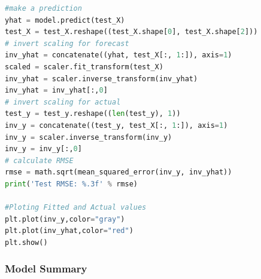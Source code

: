 \begin{lstlisting}[language=Python]
#make a prediction
yhat = model.predict(test_X)
test_X = test_X.reshape((test_X.shape[0], test_X.shape[2]))
# invert scaling for forecast
inv_yhat = concatenate((yhat, test_X[:, 1:]), axis=1)
scaled = scaler.fit_transform(test_X)
inv_yhat = scaler.inverse_transform(inv_yhat)
inv_yhat = inv_yhat[:,0]
# invert scaling for actual
test_y = test_y.reshape((len(test_y), 1))
inv_y = concatenate((test_y, test_X[:, 1:]), axis=1)
inv_y = scaler.inverse_transform(inv_y)
inv_y = inv_y[:,0]
# calculate RMSE
rmse = math.sqrt(mean_squared_error(inv_y, inv_yhat))
print('Test RMSE: %.3f' % rmse)

#Ploting Fitted and Actual values
plt.plot(inv_y,color="gray")
plt.plot(inv_yhat,color="red")
plt.show()


\end{lstlisting}


\subsubsection{Model Summary} 

